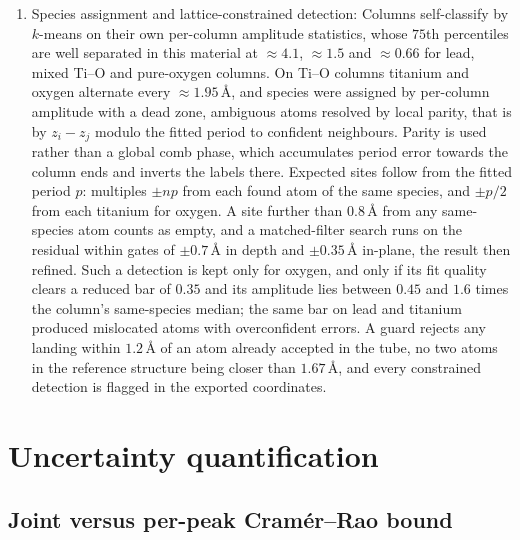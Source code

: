 \documentclass[aps,prb,twocolumn,superscriptaddress,floatfix,nofootinbib]{revtex4-2}
\begin{document}
\begin{enumerate}
\item Species assignment and lattice-constrained detection: Columns self-classify by $k$-means on their own per-column amplitude statistics, whose $75$th percentiles are well separated in this material at $\approx4.1$, $\approx1.5$ and $\approx0.66$ for lead, mixed Ti--O and pure-oxygen columns. On Ti--O columns titanium and oxygen alternate every $\approx1.95$\,\AA, and species were assigned by per-column amplitude with a dead zone, ambiguous atoms resolved by local parity, that is by $z_i-z_j$ modulo the fitted period to confident neighbours. Parity is used rather than a global comb phase, which accumulates period error towards the column ends and inverts the labels there. Expected sites follow from the fitted period $p$: multiples $\pm np$ from each found atom of the same species, and $\pm p/2$ from each titanium for oxygen. A site further than $0.8$\,\AA{} from any same-species atom counts as empty, and a matched-filter search runs on the residual within gates of $\pm0.7$\,\AA{} in depth and $\pm0.35$\,\AA{} in-plane, the result then refined. Such a detection is kept only for oxygen, and only if its fit quality clears a reduced bar of $0.35$ and its amplitude lies between $0.45$ and $1.6$ times the column's same-species median; the same bar on lead and titanium produced mislocated atoms with overconfident errors. A guard rejects any landing within $1.2$\,\AA{} of an atom already accepted in the tube, no two atoms in the reference structure being closer than $1.67$\,\AA, and every constrained detection is flagged in the exported coordinates.
\end{enumerate}

\section{Uncertainty quantification}
\label{app:uq}
\setcounter{table}{0}
\setcounter{figure}{0}

\subsection{Joint versus per-peak Cram\'er--Rao bound}
\end{document}
